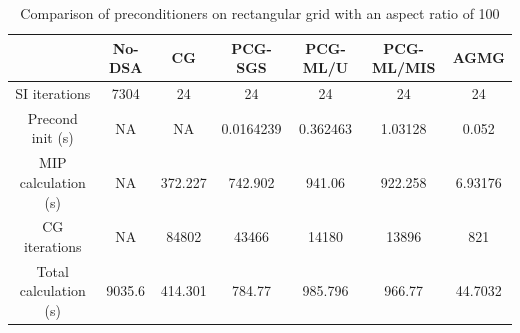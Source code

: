 \begin{table}[!htbp]
  \caption{Comparison of preconditioners on rectangular grid with an aspect
  ratio of 100}
  \begin{center}
    \begin{tabular}{|c|c|c|c|c|c|c|}
      \hline
       & No-DSA & CG & PCG-SGS & PCG-ML/U & PCG-ML/MIS & AGMG \\
      \hline
      SI iterations & 7304    & 24      & 24        & 24       & 24      & 24 \\
   Precond init (s) & NA      & NA      & 0.0164239 & 0.362463 & 1.03128 & 0.052 \\
MIP calculation (s) & NA      & 372.227 & 742.902   & 941.06   & 922.258 &
      6.93176 \\
      CG iterations & NA      & 84802   & 43466     & 14180    & 13896   & 821 \\
Total calculation (s) & 9035.6 & 414.301 & 784.77   & 985.796  & 966.77  &
      44.7032 \\
      \hline
    \end{tabular}
    \label{table_ar_100}
  \end{center}
\end{table}                  
